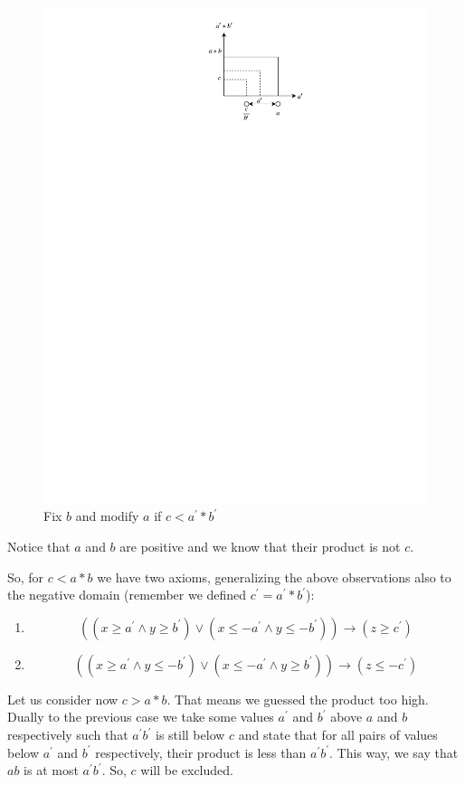 \begin{figure}[ht!]
  \centering
  \includegraphics[width=0.5\linewidth]{./figures/ICP1_2.pdf}
  \caption{Fix $b$ and modify $a$ if $c < a^\prime \ast b^\prime$}
  \label{fig:FixBModifyA}
\end{figure}

\noindent  Notice that $a$ and $b$ are positive and we know that their product is not $c$.\newline

\noindent  So, for $c < a \ast b$ we have two axioms, generalizing the above observations also to the negative domain (remember we defined $c^\prime = a^\prime \ast b^\prime$):

\begin{enumerate}
    \item $$((x \geq a^\prime \wedge y \geq b^\prime) \vee (x \leq -a^\prime \wedge y \leq -b^\prime)) \to (z \geq c^\prime)$$
    \item $$((x \geq a^\prime \wedge y \leq -b^\prime) \vee (x \leq -a^\prime \wedge y \geq b^\prime)) \to (z \leq -c^\prime)$$
\end{enumerate}

\noindent  Let us consider now $c > a \ast b$.
That means we guessed the product too high.
Dually to the previous case we take some values $a^\prime$ and $b^\prime$ above $a$ and $b$ respectively such that $a^\prime b^\prime$ is still below $c$ and state that for all pairs of values below $a^\prime$ and $b^\prime$ respectively, their product is less than $a^\prime b^\prime$.
This way, we say that $ab$ is at most $a^\prime b^\prime$.
So, $c$ will be excluded.\newline

